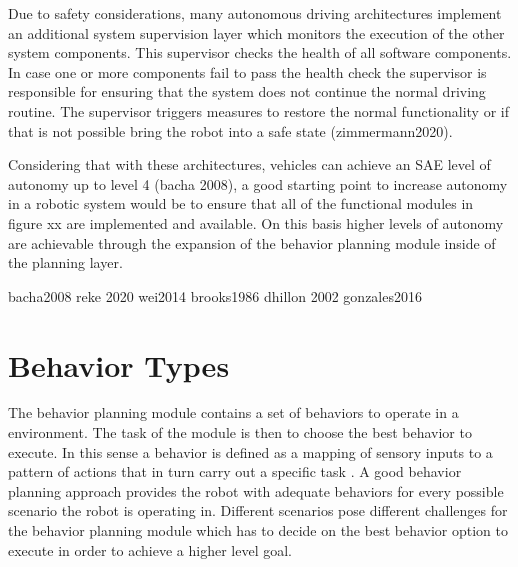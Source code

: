 Due to safety considerations, many autonomous driving architectures implement an additional system supervision layer which monitors the execution of the other system components. This supervisor checks the health of all software components. In case one or more components fail to pass the health check the supervisor is responsible for ensuring that the system does not continue the normal driving routine. The supervisor triggers measures to restore the normal functionality or if that is not possible bring the robot into a safe state (zimmermann2020). 

Considering that with these architectures, vehicles can achieve an SAE level of autonomy up to level 4 (bacha 2008),  a good starting point to increase autonomy in a robotic system would be to ensure that all of the functional modules in figure xx are implemented and available. On this basis higher levels of autonomy are achievable through the expansion of the behavior planning module inside of the planning layer. 

bacha2008
reke 2020
wei2014
brooks1986
dhillon 2002
gonzales2016

\section{Behavior Types}

The behavior planning module contains a set of behaviors to operate in a environment. The task of the module is then to choose the best behavior to execute. In this sense a behavior is defined as a mapping of sensory inputs to a pattern of actions that in turn carry out a specific task \cite{murphy2000}. A good behavior planning approach provides the robot with adequate behaviors for every possible scenario the robot is operating in. Different scenarios pose different challenges for the behavior planning module which has to decide on the best behavior option to execute in order to achieve a higher level goal. 

